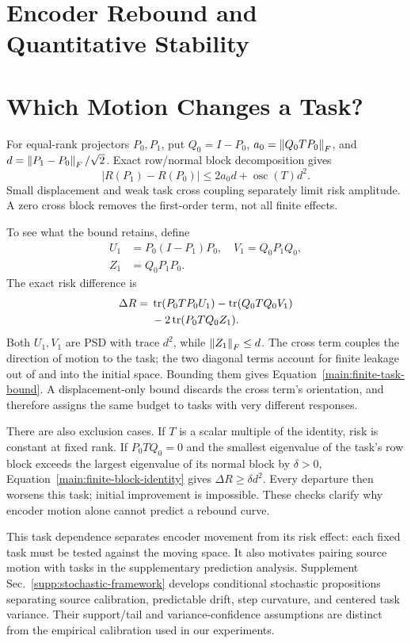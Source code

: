 \section{Encoder Rebound and Quantitative Stability}
\label{main:rebound}


\section{Which Motion Changes a Task?}
\label{main:task-coupling}
For equal-rank projectors $P_0,P_1$, put $Q_0=I-P_0$, $a_0=\left\lVert Q_0TP_0\right\rVert_F$, and $d=\left\lVert P_1-P_0\right\rVert_F/\sqrt2$. Exact row/normal block decomposition gives
\begin{equation}
 |R(P_1)-R(P_0)|\le2a_0d+\operatorname{osc}(T)d^2.
 \label{main:finite-task-bound}
\end{equation}
Small displacement and weak task cross coupling separately limit risk amplitude. A zero cross block removes the first-order term, not all finite effects.

To see what the bound retains, define
\begin{align}
 U_1&=P_0(I-P_1)P_0,\quad V_1=Q_0P_1Q_0,\nonumber\\
 Z_1&=Q_0P_1P_0.
\end{align}
The exact risk difference is
\begin{align}
 \Delta R={}&\operatorname{tr}(P_0TP_0U_1)-\operatorname{tr}(Q_0TQ_0V_1)\nonumber\\
 &-2\operatorname{tr}(P_0TQ_0Z_1).
 \label{main:finite-block-identity}
\end{align}
Both $U_1,V_1$ are PSD with trace $d^2$, while $\left\lVert Z_1\right\rVert_F\le d$. The cross term couples the direction of motion to the task; the two diagonal terms account for finite leakage out of and into the initial space. Bounding them gives Equation~\eqref{main:finite-task-bound}. A displacement-only bound discards the cross term's orientation, and therefore assigns the same budget to tasks with very different responses.

There are also exclusion cases. If $T$ is a scalar multiple of the identity, risk is constant at fixed rank. If $P_0TQ_0=0$ and the smallest eigenvalue of the task's row block exceeds the largest eigenvalue of its normal block by $\delta>0$, Equation~\eqref{main:finite-block-identity} gives $\Delta R\ge\delta d^2$. Every departure then worsens this task; initial improvement is impossible. These checks clarify why encoder motion alone cannot predict a rebound curve.

This task dependence separates encoder movement from its risk effect: each fixed task must be tested against the moving space. It also motivates pairing source motion with tasks in the supplementary prediction analysis. Supplement Sec.~\ref{supp:stochastic-framework} develops conditional stochastic propositions separating source calibration, predictable drift, step curvature, and centered task variance. Their support/tail and variance-confidence assumptions are distinct from the empirical calibration used in our experiments.

